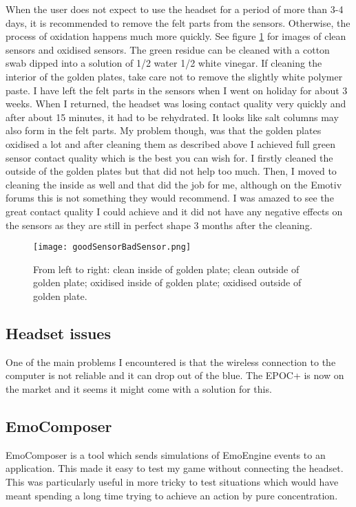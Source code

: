 When the user does not expect to use the headset for a period of more than 3-4 days, it is recommended to remove the felt parts from the sensors. Otherwise, the process of oxidation happens much more quickly. See figure \ref{fig:cleanVsOxidised} for images of clean sensors and oxidised sensors. The green residue can be cleaned with a cotton swab dipped into a solution of 1/2 water 1/2 white vinegar. If cleaning the interior of the golden plates, take care not to remove the slightly white polymer paste. I have left the felt parts in the sensors when I went on holiday for about 3 weeks. When I returned, the headset was losing contact quality very quickly and after about 15 minutes, it had to be rehydrated. It looks like salt columns may also form in the felt parts. My problem though, was that the golden plates oxidised a lot and after cleaning them as described above I achieved full green sensor contact quality which is the best you can wish for. I firstly cleaned the outside of the golden plates but that did not help too much. Then, I moved to cleaning the inside as well and that did the job for me, although on the Emotiv forums this is not something they would recommend. I was amazed to see the great contact quality I could achieve and it did not have any negative effects on the sensors as they are still in perfect shape 3 months after the cleaning.

\begin{figure}
  \centering
  \texttt{[image: goodSensorBadSensor.png]}
  \caption{From left to right: clean inside of golden plate; clean outside of golden plate; oxidised inside of golden plate; oxidised outside of golden plate.}
    \label{fig:cleanVsOxidised}           
\end{figure}

\subsection{Headset issues}
One of the main problems I encountered is that the wireless connection to the computer is not reliable and it can drop out of the blue. The EPOC+ is now on the market and it seems it might come with a solution for this.

\subsection{EmoComposer}
\label{part:emocomposer}
EmoComposer is a tool which sends simulations of EmoEngine events to an application. This made it easy to test my game without connecting the headset. This was particularly useful in more tricky to test situations which would have meant spending a long time trying to achieve an action by pure concentration.

